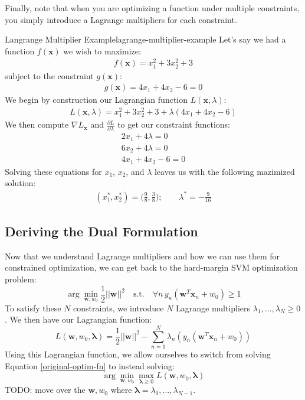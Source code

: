 Finally, note that when you are optimizing a function under multiple constraints, you simply introduce a Lagrange multipliers for each constraint.

\begin{example}{Langrange Multiplier Example}{lagrange-multiplier-example}
	Let's say we had a function $f(\textbf{x})$ we wish to maximize:
	\begin{align*}
		f(\textbf{x}) = x_{1}^{2} + 3x_{2}^{2} + 3
	\end{align*}
	subject to the constraint $g(\textbf{x})$:
	\begin{align*}
		g(\textbf{x}) = 4x_{1} + 4x_{2} - 6 = 0
	\end{align*}
	We begin by construction our Lagrangian function $L(\textbf{x}, \lambda)$:
	\begin{align*}
		L(\textbf{x}, \lambda) = x_{1}^{2} + 3x_{2}^{2} + 3 + \lambda (4x_{1} + 4x_{2} - 6)
	\end{align*}
	We then compute $\nabla L_{\textbf{x}}$ and $\frac{\partial L}{\partial \lambda}$ to get our constraint functions:
	\begin{align*}
		2x_{1} + 4\lambda = 0 \\
		6x_{2} + 4\lambda = 0 \\
		4x_{1} + 4x_{2} - 6 = 0
	\end{align*}
	Solving these equations for $x_{1}$, $x_{2}$, and $\lambda$ leaves us with the following mazimized solution:
	\begin{align*}
		(x_{1}^{*}, x_{2}^{*}) = \bigg(\frac{9}{8}, \frac{3}{8}\bigg); \qquad \lambda^{*} = -\frac{9}{16}
	\end{align*}
\end{example}

\subsection{Deriving the Dual Formulation}
Now that we understand Lagrange multipliers and how we can use them for constrained optimization, we can get back to the hard-margin SVM optimization problem:
\begin{equation} \label{original-optim-fn}
	\arg\min_{\textbf{w}, w_{0}} \frac{1}{2} ||\textbf{w}||^{2} \quad \text{s.t.} \quad \forall n \, y_{n}(\textbf{w}^{T}\textbf{x}_{n} + w_{0}) \geq 1
\end{equation}
To satisfy these $N$ constraints, we introduce $N$ Lagrange multipliers $\lambda_{1}, ..., \lambda_{N} \geq 0$. We then have our Lagrangian function:
\begin{equation} \label{lagrange-equation}
	L(\textbf{w}, w_{0}, \boldsymbol{\lambda}) = \frac{1}{2} ||\textbf{w}||^{2} - \sum_{n=1}^{N} \lambda_{n} (y_{n}(\textbf{w}^{T} \textbf{x}_{n} + w_{0}))
\end{equation}
Using this Lagrangian function, we allow ourselves to switch from solving Equation \ref{original-optim-fn} to instead solving:
\begin{equation} \label{new-optim-fn}
	\arg\min_{\textbf{w}, w_{0}} \max_{\boldsymbol{\lambda} \geq 0} L(\textbf{w}, w_{0}, \boldsymbol{\lambda})
\end{equation}
TODO: move over the $\textbf{w}, w_{0}$
where $\boldsymbol{\lambda} = \lambda_{0}, ..., \lambda_{N-1}$.

